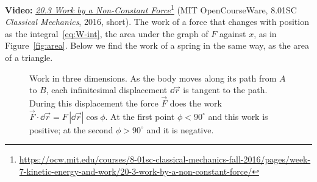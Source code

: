 \documentclass[11pt,a4paper]{article}
\begin{document}
\begin{aside}
\textbf{Video:}
\href{https://ocw.mit.edu/courses/8-01sc-classical-mechanics-fall-2016/pages/week-7-kinetic-energy-and-work/20-3-work-by-a-non-constant-force/}{\emph{20.3
Work by a Non-Constant
Force}}\footnote{\url{https://ocw.mit.edu/courses/8-01sc-classical-mechanics-fall-2016/pages/week-7-kinetic-energy-and-work/20-3-work-by-a-non-constant-force/}}
(MIT OpenCourseWare, 8.01SC \emph{Classical Mechanics}, 2016, short). The work of a force that
changes with position as the integral~\eqref{eq:W-int}, the area under the graph of $F$ against $x$,
as in Figure~\ref{fig:area}. Below we find the work of a spring in the same way, as the area of a
triangle.
\end{aside}

\begin{figure}[ht]
\centering
\begin{minipage}[c]{0.46\textwidth}
\centering
{}
\end{minipage}\hfill
\begin{minipage}[c]{0.5\textwidth}
\caption{Work in three dimensions. As the body moves along its path from $A$ to $B$, each
infinitesimal displacement $\dd\vec{r}$ is tangent to the path. During this displacement the force
$\vec{F}$ does the work $\vec{F}\cdot\dd\vec{r} = F\,|\dd\vec{r}|\cos\phi$. At the first point $\phi < 90^\circ$ and
this work is positive; at the second $\phi > 90^\circ$ and it is negative.}\label{fig:path}
\end{minipage}
\end{figure}
\end{document}
